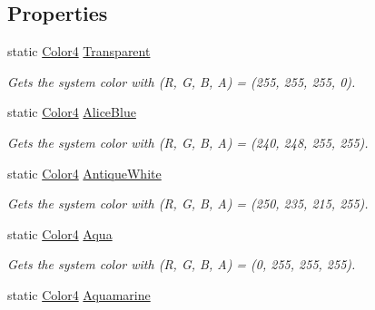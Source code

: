 \subsection*{Properties}
\begin{DoxyCompactItemize}
\item 
static \hyperlink{struct_open_t_k_1_1_graphics_1_1_color4}{Color4} \hyperlink{struct_open_t_k_1_1_graphics_1_1_color4_aff989d1d2edd28e0e3f8f664fbc380bd}{Transparent}
\begin{DoxyCompactList}\small\item\em Gets the system color with (R, G, B, A) = (255, 255, 255, 0). \end{DoxyCompactList}\item 
static \hyperlink{struct_open_t_k_1_1_graphics_1_1_color4}{Color4} \hyperlink{struct_open_t_k_1_1_graphics_1_1_color4_a0256eea660be36faebb89f2c1a67cbb9}{Alice\-Blue}
\begin{DoxyCompactList}\small\item\em Gets the system color with (R, G, B, A) = (240, 248, 255, 255). \end{DoxyCompactList}\item 
static \hyperlink{struct_open_t_k_1_1_graphics_1_1_color4}{Color4} \hyperlink{struct_open_t_k_1_1_graphics_1_1_color4_a77b9e67d5656ff850cf4379674bc04c2}{Antique\-White}
\begin{DoxyCompactList}\small\item\em Gets the system color with (R, G, B, A) = (250, 235, 215, 255). \end{DoxyCompactList}\item 
static \hyperlink{struct_open_t_k_1_1_graphics_1_1_color4}{Color4} \hyperlink{struct_open_t_k_1_1_graphics_1_1_color4_a8e51eee5fbb7ec761d97489cdbf2e665}{Aqua}
\begin{DoxyCompactList}\small\item\em Gets the system color with (R, G, B, A) = (0, 255, 255, 255). \end{DoxyCompactList}\item 
static \hyperlink{struct_open_t_k_1_1_graphics_1_1_color4}{Color4} \hyperlink{struct_open_t_k_1_1_graphics_1_1_color4_a30856b5a2ea4119c5161f84c4a01f363}{Aquamarine}

\end{DoxyCompactItemize}
